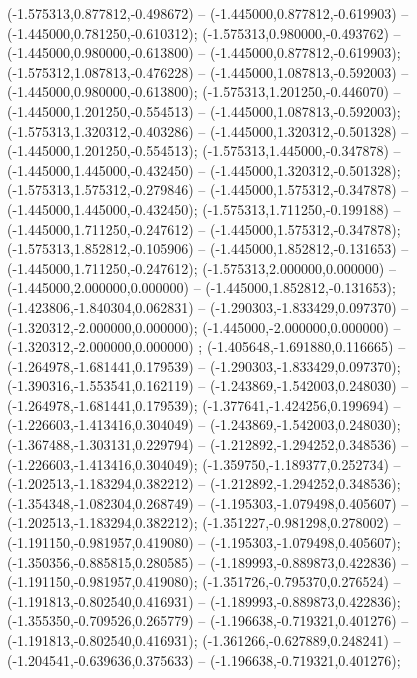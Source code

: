  (-1.575313,0.877812,-0.498672) -- (-1.445000,0.877812,-0.619903) -- (-1.445000,0.781250,-0.610312);
 (-1.575313,0.980000,-0.493762) -- (-1.445000,0.980000,-0.613800) -- (-1.445000,0.877812,-0.619903);
 (-1.575312,1.087813,-0.476228) -- (-1.445000,1.087813,-0.592003) -- (-1.445000,0.980000,-0.613800);
 (-1.575313,1.201250,-0.446070) -- (-1.445000,1.201250,-0.554513) -- (-1.445000,1.087813,-0.592003);
 (-1.575313,1.320312,-0.403286) -- (-1.445000,1.320312,-0.501328) -- (-1.445000,1.201250,-0.554513);
 (-1.575313,1.445000,-0.347878) -- (-1.445000,1.445000,-0.432450) -- (-1.445000,1.320312,-0.501328);
 (-1.575313,1.575312,-0.279846) -- (-1.445000,1.575312,-0.347878) -- (-1.445000,1.445000,-0.432450);
 (-1.575313,1.711250,-0.199188) -- (-1.445000,1.711250,-0.247612) -- (-1.445000,1.575312,-0.347878);
 (-1.575313,1.852812,-0.105906) -- (-1.445000,1.852812,-0.131653) -- (-1.445000,1.711250,-0.247612);
 (-1.575313,2.000000,0.000000) -- (-1.445000,2.000000,0.000000) -- (-1.445000,1.852812,-0.131653);
 (-1.423806,-1.840304,0.062831) -- (-1.290303,-1.833429,0.097370) -- (-1.320312,-2.000000,0.000000);
 (-1.445000,-2.000000,0.000000) -- (-1.320312,-2.000000,0.000000) ;
 (-1.405648,-1.691880,0.116665) -- (-1.264978,-1.681441,0.179539) -- (-1.290303,-1.833429,0.097370);
 (-1.390316,-1.553541,0.162119) -- (-1.243869,-1.542003,0.248030) -- (-1.264978,-1.681441,0.179539);
 (-1.377641,-1.424256,0.199694) -- (-1.226603,-1.413416,0.304049) -- (-1.243869,-1.542003,0.248030);
 (-1.367488,-1.303131,0.229794) -- (-1.212892,-1.294252,0.348536) -- (-1.226603,-1.413416,0.304049);
 (-1.359750,-1.189377,0.252734) -- (-1.202513,-1.183294,0.382212) -- (-1.212892,-1.294252,0.348536);
 (-1.354348,-1.082304,0.268749) -- (-1.195303,-1.079498,0.405607) -- (-1.202513,-1.183294,0.382212);
 (-1.351227,-0.981298,0.278002) -- (-1.191150,-0.981957,0.419080) -- (-1.195303,-1.079498,0.405607);
 (-1.350356,-0.885815,0.280585) -- (-1.189993,-0.889873,0.422836) -- (-1.191150,-0.981957,0.419080);
 (-1.351726,-0.795370,0.276524) -- (-1.191813,-0.802540,0.416931) -- (-1.189993,-0.889873,0.422836);
 (-1.355350,-0.709526,0.265779) -- (-1.196638,-0.719321,0.401276) -- (-1.191813,-0.802540,0.416931);
 (-1.361266,-0.627889,0.248241) -- (-1.204541,-0.639636,0.375633) -- (-1.196638,-0.719321,0.401276);
